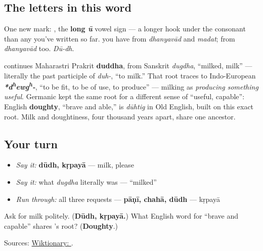 \subsection*{The letters in this word}
One new mark: \textbf{}, the \textbf{long \emph{ū}} vowel sign — a longer hook under the consonant than any you've written so far. \textbf{} you have from \emph{dhanyavād} and \emph{madat}; \textbf{} from \emph{dhanyavād} too. \emph{Dū-dh}.

\begin{cousinweb}
\textbf{} continues Maharastri Prakrit \textbf{duddha}, from Sanskrit \textbf{} \emph{dugdha}, \textquotedblleft{}milked, milk\textquotedblright{} — literally the past participle of \textbf{} \emph{duh-}, \textquotedblleft{}to milk.\textquotedblright{} That root traces to Indo-European \emph{\textbf{*d\textsuperscript{h}ewg\textsuperscript{h}-}}, \textquotedblleft{}to be fit, to be of use, to produce\textquotedblright{} — milking as \emph{producing something useful}. Germanic kept the same root for a different sense of \textquotedblleft{}useful, capable\textquotedblright{}: English \textbf{doughty}, \textquotedblleft{}brave and able,\textquotedblright{} is \emph{dūhtig} in Old English, built on this exact root. Milk and doughtiness, four thousand years apart, share one ancestor.
\end{cousinweb}

\subsection*{Your turn}
\begin{itemize}
\raggedright
  \item \emph{Say it:} \textbf{dūdh, kṛpayā} — milk, please
  \item \emph{Say it:} what \emph{dugdha} literally was — \textquotedblleft{}milked\textquotedblright{}
  \item \emph{Run through:} all three requests — \textbf{pāṇī, chahā, dūdh} — kṛpayā
\end{itemize}

\begin{tcolorbox}[breakable,colback=teal!4,colframe=teal!35!black,title={Before you move on}]
Ask for milk politely. (\textbf{Dūdh, kṛpayā.}) What English word for \textquotedblleft{}brave and capable\textquotedblright{} shares \textbf{}'s root? (\textbf{Doughty}.)

Sources: \href{https://en.wiktionary.org/wiki/\%E0\%A4\%A6\%E0\%A5\%82\%E0\%A4\%A7}{Wiktionary: }.
\end{tcolorbox}
